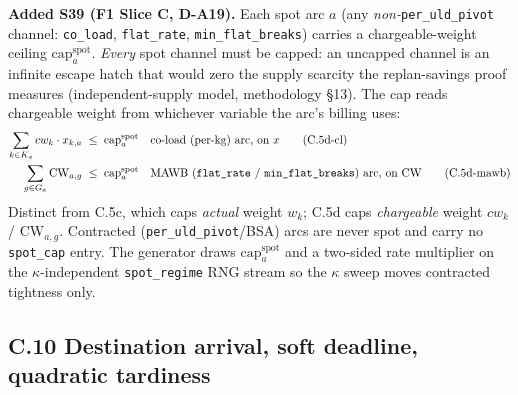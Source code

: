 \documentclass[11pt,a4paper]{article}
\theoremstyle{definition}
\begin{document}
\textbf{Added S39 (F1 Slice C, D-A19).} Each spot arc $a$ (any \emph{non-}\texttt{per\_uld\_pivot}
channel: \texttt{co\_load}, \texttt{flat\_rate}, \texttt{min\_flat\_breaks}) carries a
chargeable-weight ceiling $\text{cap}^{\text{spot}}_a$. \emph{Every} spot channel must be capped:
an uncapped channel is an infinite escape hatch that would zero the supply scarcity the
replan-savings proof measures (independent-supply model, methodology \S13). The cap reads
chargeable weight from whichever variable the arc's billing uses:
\begin{align}
  \sum_{k \in K_a} cw_k \cdot x_{k,a} &\;\leq\; \text{cap}^{\text{spot}}_a
    && \text{co-load (per-kg) arc, on } x \tag{C.5d-cl} \label{eq:C5d-cl} \\
  \sum_{g \in G_a} \text{CW}_{a,g} &\;\leq\; \text{cap}^{\text{spot}}_a
    && \text{MAWB (\texttt{flat\_rate} / \texttt{min\_flat\_breaks}) arc, on } \text{CW} \tag{C.5d-mawb} \label{eq:C5d-mawb}
\end{align}
Distinct from C.5c, which caps \emph{actual} weight $w_k$; C.5d caps \emph{chargeable} weight
$cw_k$ / $\text{CW}_{a,g}$. Contracted (\texttt{per\_uld\_pivot}/BSA) arcs are never spot and
carry no \texttt{spot\_cap} entry. The generator draws $\text{cap}^{\text{spot}}_a$ and a
two-sided rate multiplier on the $\kappa$-independent \texttt{spot\_regime} RNG stream so the
$\kappa$ sweep moves contracted tightness only.

\subsection*{C.10 Destination arrival, soft deadline, quadratic tardiness }
\end{document}
